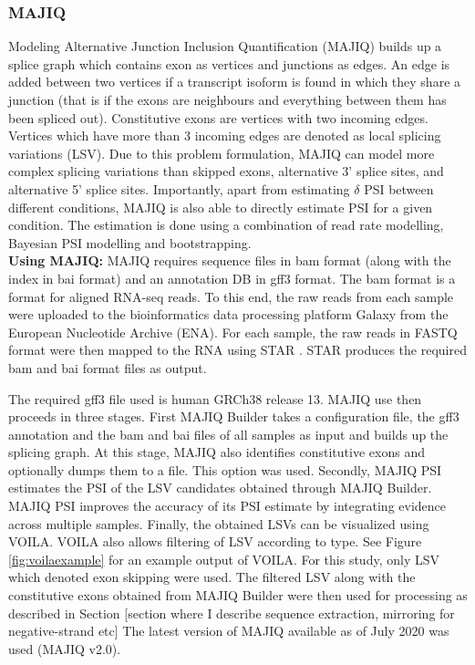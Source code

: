 \subsubsection{MAJIQ}\label{subsubsec:majiq}
Modeling Alternative Junction Inclusion Quantification (MAJIQ) builds up a splice graph \cite{majiq2} which contains exon as vertices and junctions as edges. An edge is added between two vertices if a transcript isoform is found in which they share a junction (that is if the exons are neighbours and everything between them has been spliced out).
Constitutive exons are vertices with two incoming edges.
Vertices which have more than 3 incoming edges are denoted as local splicing variations (LSV). Due to this problem formulation, MAJIQ can model more complex splicing variations than skipped exons, alternative 3' splice sites, and alternative 5' splice sites. Importantly, apart from estimating $\delta$ PSI between different conditions, MAJIQ is also able to directly estimate PSI for a given condition. The estimation is done using a combination of read rate modelling, Bayesian PSI modelling and bootstrapping.\\
\textbf{Using MAJIQ:} MAJIQ requires sequence files in bam format (along with the index in bai format) and an annotation DB in gff3 format. The bam format is a format for aligned RNA-seq reads. 
To this end, the raw reads from each sample were uploaded to the bioinformatics data processing platform Galaxy \cite{galaxy} from the European Nucleotide Archive (ENA). For each sample, the raw reads in FASTQ format were then mapped to the RNA using STAR \cite{star}. STAR produces the required bam and bai format files as output.

The required gff3 file used is human GRCh38 release 13.
MAJIQ use then proceeds in three stages. First MAJIQ Builder takes a configuration file, the gff3 annotation and the bam and bai files of all samples as input and builds up the splicing graph. At this stage, MAJIQ also identifies constitutive exons and optionally dumps them to a file. This option was used.
Secondly, MAJIQ PSI estimates the PSI of the LSV candidates obtained through MAJIQ Builder. MAJIQ PSI improves the accuracy of its PSI estimate by integrating evidence across multiple samples.
Finally, the obtained LSVs can be visualized using VOILA. VOILA also allows filtering of LSV according to type. See Figure \ref{fig:voilaexample} for an example output of VOILA. For this study, only LSV which denoted exon skipping were used. The filtered LSV along with the constitutive exons obtained from MAJIQ Builder were then used for processing as described in Section [section where I describe sequence extraction, mirroring for negative-strand etc]
The latest version of MAJIQ available as of July 2020 was used (MAJIQ v2.0).



